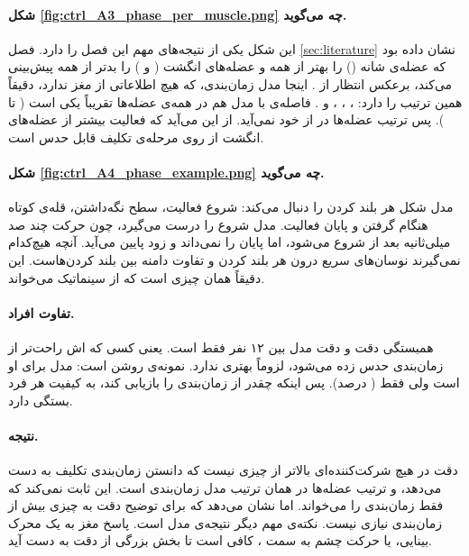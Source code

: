 
\paragraph{شکل \ref{fig:ctrl_A3_phase_per_muscle.png} چه می‌گوید.} این شکل یکی از نتیجه‌های مهم این فصل را دارد. فصل \ref{sec:literature} نشان داده بود که  عضله‌ی شانه () را بهتر از همه و عضله‌های انگشت ( و ) را بدتر از همه پیش‌بینی می‌کند، برعکس انتظار از . اینجا مدل زمان‌بندی، که هیچ اطلاعاتی از مغز ندارد، دقیقاً همین ترتیب را دارد:  ،  ،  ،   و  . فاصله‌ی  با مدل  هم در همه‌ی عضله‌ها تقریباً یکی است ( تا ). پس ترتیب عضله‌ها در  از خود  نمی‌آید. از این می‌آید که فعالیت  بیشتر از عضله‌های انگشت از روی مرحله‌ی تکلیف قابل حدس است.


\paragraph{شکل \ref{fig:ctrl_A4_phase_example.png} چه می‌گوید.} مدل  شکل هر بلند کردن را دنبال می‌کند: شروع فعالیت، سطح نگه‌داشتن، قله‌ی کوتاه  هنگام گرفتن و پایان فعالیت. مدل  شروع را درست می‌گیرد، چون حرکت چند صد میلی‌ثانیه بعد از  شروع می‌شود، اما پایان را نمی‌داند و زود پایین می‌آید. آنچه هیچ‌کدام نمی‌گیرند نوسان‌های سریع درون هر بلند کردن و تفاوت دامنه بین بلند کردن‌هاست. این دقیقاً همان چیزی است که  از سینماتیک می‌خواند.

\paragraph{تفاوت افراد.} همبستگی دقت  و دقت مدل  بین ۱۲ نفر فقط  است. یعنی کسی که اش راحت‌تر از زمان‌بندی حدس زده می‌شود، لزوماً  بهتری ندارد. نمونه‌ی روشن  است: مدل  برای او  است ولی  فقط  (  درصد). پس اینکه  چقدر از زمان‌بندی را بازیابی کند، به کیفیت  هر فرد بستگی دارد.

\paragraph{نتیجه.} دقت  در هیچ شرکت‌کننده‌ای بالاتر از چیزی نیست که دانستن زمان‌بندی تکلیف به دست می‌دهد، و ترتیب عضله‌ها در  همان ترتیب مدل زمان‌بندی است. این ثابت نمی‌کند که  فقط زمان‌بندی را می‌خواند. اما نشان می‌دهد که برای توضیح دقت  به چیزی بیش از زمان‌بندی نیازی نیست. نکته‌ی مهم دیگر نتیجه‌ی مدل  است. پاسخ مغز به یک محرک بینایی، یا حرکت چشم به سمت ، کافی است تا بخش بزرگی از دقت  به دست آید.

